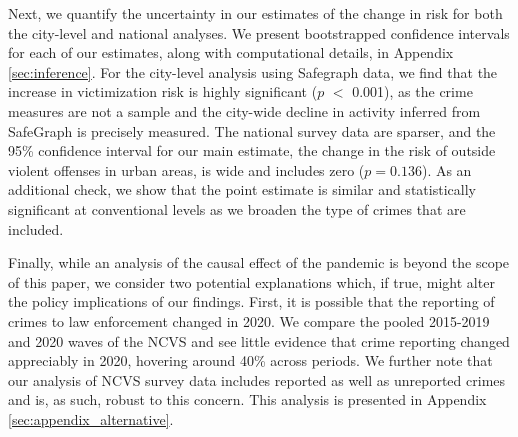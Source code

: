 \documentclass[12pt]{article}
\begin{document}
Next, we quantify the uncertainty in our estimates of the change in risk for both the city-level and national analyses. We present bootstrapped confidence intervals for each of our estimates, along with computational details, in Appendix \ref{sec:inference}. For the city-level analysis using Safegraph data, we find that the increase in victimization risk is highly significant ($p$ $<$ 0.001), as the crime measures are not a sample and the city-wide decline in activity inferred from SafeGraph is precisely measured. The national survey data are sparser, and the 95\% confidence interval for our main estimate, the change in the risk of outside violent offenses in urban areas, is wide and includes zero ($p =0.136$). As an additional check, we show that the point estimate is similar and statistically significant at conventional levels as we broaden the type of crimes that are included.

Finally, %
while an analysis of the causal effect of the pandemic is beyond the scope of this paper, we consider two potential explanations which, if true, might alter the policy implications of our findings. First, it is possible that the reporting of crimes to law enforcement changed in 2020. We compare the pooled 2015-2019 and 2020 waves of the NCVS and see little evidence that crime reporting changed appreciably in 2020, hovering around 40\% across periods.
We further note that our analysis of NCVS survey data includes reported as well as unreported crimes and is, as such, robust to this concern. This analysis is presented in Appendix \ref{sec:appendix_alternative}.
\end{document}
